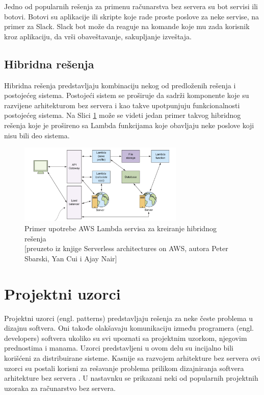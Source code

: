 \documentclass[12pt,oneside]{memoir}
\begin{document}
Jedno od popularnih rešenja za primenu računarstva bez servera su bot servisi ili botovi. Botovi su aplikacije ili skripte koje rade proste poslove za neke servise, na primer za Slack. Slack bot može da reaguje na komande koje mu zada korisnik kroz aplikaciju, da vrši obaveštavanje, sakupljanje izveštaja. 

\subsection{Hibridna rešenja}

Hibridna rešenja predstavljaju kombinaciju nekog od predloženih rešenja i postojećeg sistema. Postojeći sistem se proširuje da sadrži komponente koje su razvijene arhitekturom bez servera i kao takve upotpunjuju funkcionalnosti postojećeg sistema. Na Slici \ref{fig:HibridnoResenje} može se videti jedan primer takvog hibridnog rešenja koje je prošireno sa Lambda funkcijama koje obavljaju neke poslove koji nisu bili deo sistema.

\begin{figure}[!ht]
  \centering
  \includegraphics[width=0.7\textwidth]{Slika 10.png}
  \caption{Primer upotrebe AWS Lambda servisa za kreiranje hibridnog rešenja\\\footnotesize[preuzeto iz knjige Serverless architectures on AWS, autora Peter Sbarski, Yan Cui i Ajay Nair]}
  \label{fig:HibridnoResenje}
\end{figure}

\section{Projektni uzorci}

Projektni uzorci (engl. patterns) predstavljaju rešenja za neke česte problema u dizajnu softvera. Oni takođe olakšavaju komunikaciju između programera (engl. developers) softvera ukoliko su svi upoznati sa projektnim uzorkom, njegovim prednostima i manama. Uzorci predstavljeni u ovom delu su incijalno bili korišćeni za distribuirane sisteme. Kasnije sa razvojem arhitekture bez servera ovi uzorci su postali korisni za rešavanje problema prilikom dizajniranja softvera arhitekture bez servera \cite{sa}. U nastavnku se prikazani neki od popularnih projektnih uzoraka za računarstvo bez servera.
\end{document}
